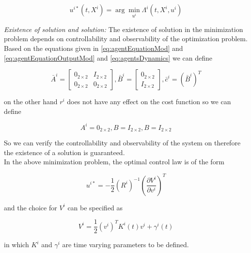 \documentclass[conference]{IEEEtran}
\begin{document}
\begin{equation}\label{eq:HJB2Specific}
u^{i*}(t,X^{i})=\arg \displaystyle \min_{u^{i}} \Lambda^{i}(t,X^{i},u^{i})
\end{equation}

\textit{Existence of solution and solution:} The existence of solution in the minimization problem depends on controllability and observability of the optimization problem. Based on the equations given in \ref{eq:agentEquationMod} and \ref{eq:agentEquationOutputMod} and \ref{eq:agentsDynamics} we can define

\begin{equation}\label{eq:ABCbar}
\bar{A}^{i}=
\begin{bmatrix}
0_{2 \times 2} & I_{2 \times 2} \\
0_{2 \times 2} & 0_{2 \times 2}
\end{bmatrix}
,
\bar{B}^{i}=
\begin{bmatrix}
0_{2 \times 2} \\
I_{2 \times 2}
\end{bmatrix}
,
\bar{c}^{i}=(\bar{B}^{i})^{T}
\end{equation}

on the other hand $r^{i}$ does not have any effect on the cost function so we can define

\begin{equation}\label{eq:ABC}
A^{i}=0_{2 \times 2}
,
B=I_{2 \times 2}
,
B=I_{2 \times 2}
\end{equation}

So we can verify the controllability and observability of the system on therefore the existence of a solution is guaranteed.\\

In the above minimization problem, the optimal control law is of the form

\begin{equation}\label{eq:optimalControlLaw}
u^{i*}=-\frac{1}{2}(R^{i})^{-1}(\frac{\partial V^{i}}{\partial v^{i}})^{T}
\end{equation}

and the choice for $V^{i}$ can be specified as

\begin{equation}\label{eq:Vfunction}
V^{i}=\frac{1}{2}(v^{i})^{T}K^{i}(t)v^{i}+\gamma^{i}(t)
\end{equation}

in which $K^{i}$ and $\gamma^{i}$ are time varying parameters to be defined.\\
\end{document}
